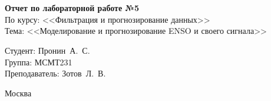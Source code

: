 \begin{titlepage}
	\centering
	
	\vspace{-2.2mm}
	\vhrulefill{0.9mm}\\
	\vspace{-7mm}
	\vhrulefill{0.2mm}\\
	\vspace{2mm}
	
	\vspace{50mm}
	
	\vspace{30mm}
	
	\textbf{Отчет по лабораторной работе №5}\\
	По курсу: <<Фильтрация и прогнозирование данных>>\\
	Тема: <<Моделирование и прогнозирование ENSO и своего сигнала>>\\
	
	\vspace{60mm}
	
	\hspace{70mm} Студент:       \hfill Пронин~А.~С.\\
	\hspace{70mm} Группа:        \hfill МСМТ231\\
	\hspace{70mm} Преподаватель: \hfill Зотов~Л.~В.\\
	
	\vfill
	
	Москва\\
	\the\year
\end{titlepage}

\setcounter{page}{2}